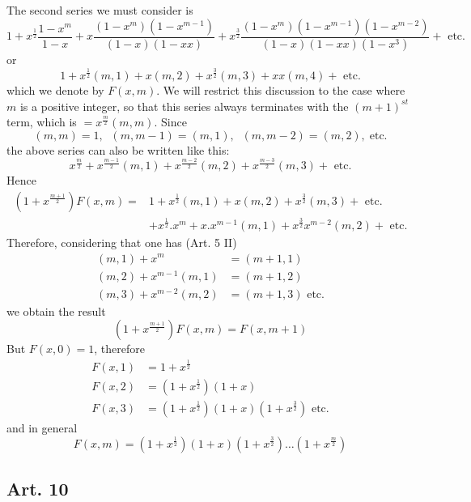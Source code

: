 \documentclass{book}
\theoremstyle{plain}
\theoremstyle{remark}
\begin{document}
The second series we must consider is
\[ 1 + x^{\frac{1}{2}} \frac{1-x^m}{1-x} + x \frac{(1-x^m)(1-x^{m-1})}{(1-x)(1-xx)} + x^{\frac{3}{2}} \frac{(1-x^m)(1-x^{m-1})(1-x^{m-2})}{(1-x)(1-xx)(1-x^3)} + \textrm{ etc.} \]
or 
\[ 1 + x^{\frac{1}{2}} (m,1) + x (m,2) + x^{\frac{3}{2}} (m,3) + xx (m,4) + \textrm{ etc.} \]
which we denote by $F(x,m)$.  We will restrict this discussion to the case where $m$ is a positive integer, so that this series always terminates with the $(m+1)^{st}$ term, which is $=x^{\frac{m}{2}} (m,m)$.  Since
\[ (m,m)=1,\;\; (m,m-1)=(m,1),\;\; (m,m-2) = (m,2), \;\textrm{etc.} \]
the above series can also be written like this:
\[ x^{\frac{m}{2}} + x^{\frac{m-1}{2}} (m,1) + x^{\frac{m-2}{2}} (m,2) + x^{\frac{m-3}{2}} (m,3) + \textrm{ etc.} \]
Hence
\begin{align*} (1 + x^{\frac{m+1}{2}}) F(x,m) = &1 + x^{\frac{1}{2}} (m,1) + x (m,2) + x^{\frac{3}{2}} (m,3) + \textrm{ etc.} \\ &+x^{\frac{1}{2}}.x^m + x.x^{m-1} (m,1) + x^{\frac{3}{2}} x^{m-2} (m,2) + \textrm{ etc.} \end{align*}
Therefore, considering that one has (Art. 5 II) 
\begin{align*} 
(m,1) + x^m &= (m+1,1) \\
(m,2) +x^{m-1}(m,1) &= (m+1,2) \\
(m,3) + x^{m-2}(m,2) &= (m+1,3) \textrm{ etc.} 
\end{align*}
we obtain the result
\begin{equation} (1+x^{\frac{m+1}{2}}) F(x,m) = F(x,m+1) \label{eqn3} \end{equation}
But $F(x,0)=1$, therefore
\begin{align*}
 F(x,1) &= 1 + x^{\frac{1}{2}} \\
 F(x,2) &= (1+x^{\frac{1}{2}}) (1+x) \\
 F(x,3) &= (1+x^{\frac{1}{2}}) (1+x) (1+x^{\frac{3}{2}}) \textrm{ etc.} 
 \end{align*}
 and in general
 \begin{equation}
  F(x,m) = (1+x^{\frac{1}{2}})(1+x)(1+x^{\frac{3}{2}}) \dots (1+x^{\frac{m}{2}})  \label{eqn4}
  \end{equation}

\subsection*{Art. 10} 
\end{document}
